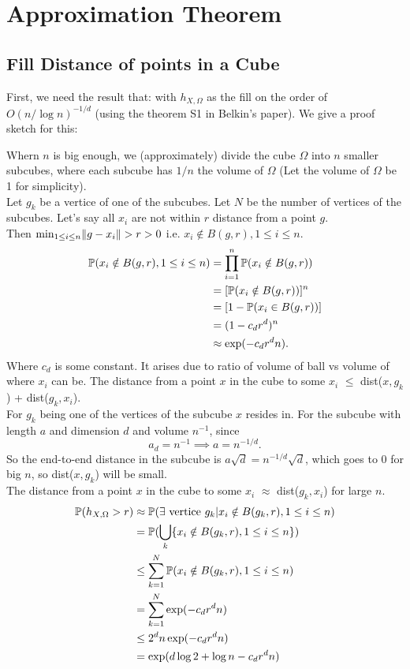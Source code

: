 \documentclass[twoside]{memoir}
\begin{document}
\section{Approximation Theorem} \label{sec:AppThm}
\subsection{Fill Distance of points in a Cube}
First, we need the result that: with $h_{X,\Omega}$ as the fill on the order of $O(n/\log n)^{-1/d}$ (using the theorem S1 in Belkin's paper). We give a proof sketch for this:

Whern $n$ is big enough, we (approximately) divide the cube $\Omega$ into $n$ smaller subcubes, where each subcube has $1/n$ the volume of $\Omega$ (Let the volume of $\Omega$ be 1 for simplicity).\\
Let $g_k$ be a vertice of one of the subcubes. Let $N$ be the number of vertices of the subcubes.
Let's say all $x_i$ are not within $r$ distance from a point $g$.\\ Then $\min_{1 \leq i \leq n} \lVert g - x_i\rVert > r > 0 $ i.e. 
$x_i \notin B(g, r), 1\leq i\leq n$.
\begin{equation*}
\begin{split}
\mathbb{P}(x_i \notin B(g, r), 1\leq i\leq n) &= \prod_{i=1}^{n} \mathbb{P}(x_i \notin B(g, r)) \\
&= [\mathbb{P}(x_i \notin B(g, r))]^n \\
&= [1 - \mathbb{P}(x_i \in B(g, r))] \\
&= (1 - c_d r^d)^n \\
&\approx \exp(-c_d r^d n). 
\end{split}
\end{equation*}
Where $c_d$ is some constant. It arises due to ratio of volume of ball vs volume of where $x_i$ can be.
The distance from a point $x$ in the cube to some $x_i$ $\leq$ dist($x, g_k$) + dist($g_k, x_i$).\\
For $g_k$ being one of the vertices of the subcube $x$ resides in. For the subcube with length $a$ and dimension $d$ and volume $n^{-1}$, since 
\[ a_d = n^{-1} \implies a = n^{-1/d}. \]
So the end-to-end distance in the subcube is $a\sqrt{d} = n^{-1/d}\sqrt{d}$, which goes to 0 for big $n$, so dist($x, g_k$) will be small.\\
The distance from a point $x$ in the cube to some $x_i$ $\approx$ dist($g_k, x_i$) for large $n$.
\begin{equation*}
\begin{split}
\mathbb{P}(h_{X,\Omega} > r) &\approx \mathbb{P}(\exists \text{ vertice } g_k | x_i \notin B(g_k, r), 1\leq i\leq n)\\
&= \mathbb{P}(\bigcup_{k} \{ x_i \notin B(g_k, r), 1 \leq i \leq n\} ) \\
&\leq \sum_{k=1}^{N}\mathbb{P}(x_i \notin B(g_k, r), 1 \leq i \leq n) \\
&= \sum_{k=1}^{N} \exp(-c_d r^d n)\\
&\leq 2^d n \exp(-c_d r^d n)\\
&= \exp(d\log 2+\log n - c_d r^d n )
\end{split}
\end{equation*}
\end{document}
